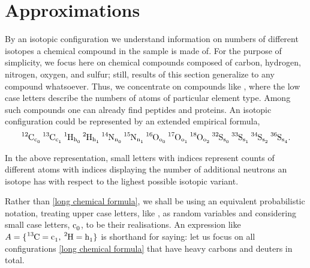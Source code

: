 \section{Approximations}

By an isotopic configuration we understand information on numbers of different isotopes a chemical compound in the sample is made of. For the purpose of simplicity, we focus here on chemical compounds composed of carbon, hydrogen, nitrogen, oxygen, and sulfur; still, results of this section generalize to any compound whatsoever. Thus, we concentrate on compounds like \molecule, where the low case letters describe the numbers of atoms of particular element type. Among such compounds one can already find peptides and proteins. An isotopic configuration could be represented by an extended empirical formula, 
\begin{equation}\label{long chemical formula}
	\text{\moleculeIsotopic}.
\end{equation}

In the above representation, small letters with indices represent counts of different atoms with indices displaying the number of additional neutrons an isotope has with respect to the lighest possible isotopic variant. 

Rather than \eqref{long chemical formula}, we shall be using an equivalent probabilistic notation, treating upper case letters, like , as random variables and considering small case letters, $\cem{c_0}$, to be their realisations. An expression like $A = \{ \ce{^{13}C} = \cem{c_1},\, \ce{^{2}H} = \cem{h_1} \}$ is shorthand for saying: let us focus on all configurations \eqref{long chemical formula} that have  heavy carbons and  deuters in total.


